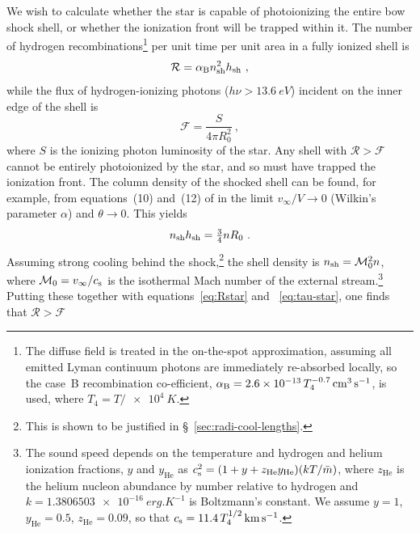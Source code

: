 We wish to calculate whether the star is capable of photoionizing the
entire bow shock shell, or whether the ionization front will be
trapped within it.  The number of hydrogen recombinations\footnote{%
  The diffuse field is treated in the on-the-spot approximation,
  assuming all emitted Lyman continuum photons are immediately
  re-absorbed locally, so the case~B recombination co-efficient,
  \(\alphaB = \num{2.6e-13}\, T_4^{-0.7}\, \si{cm^3.s^{-1}}\), is
  used, where \(T_4 = T/\SI{e4}{K}\).} %
per unit time per unit area in a fully ionized shell is
\begin{equation}
  \label{eq:shell-recombination-rate}
  \mathcal{R} = \alphaB n\shell^2 h\shell \ ,
\end{equation}
while the flux of hydrogen-ionizing photons
(\(h \nu > \SI{13.6}{eV}\)) incident on the inner edge of the shell is
\begin{equation}
  \label{eq:shell-ionizing-flux}
  \mathcal{F} = \frac{S} {4 \pi R_0^2} \ , 
\end{equation}
where \(S\) is the ionizing photon luminosity of the star.  Any shell
with \(\mathcal{R} > \mathcal{F}\) cannot be entirely photoionized by
the star, and so must have trapped the ionization front.  The column
density of the shocked shell can be found, for example, from
equations~(10) and~(12) of \citet{Wilkin:1996a} in the limit
\(v_\infty/V \to 0\) (Wilkin's parameter \(\alpha\)) and \(\theta \to 0\).  This yields
\begin{equation}
  \label{eq:shocked-shell-column}
  n\shell h\shell = \tfrac34 n R_0 \ .
\end{equation}
Assuming strong cooling behind the shock,\footnote{%
  This is shown to be justified in \S~\ref{sec:radi-cool-lengths}.
} %
the shell density is \(n\shell = \mathcal{M}_0^2 n\), where
\(\mathcal{M}_0 = v_\infty / \sound\) is the isothermal Mach number of the
external stream.\footnote{%
  \label{fn:temperature-dependence}
  The sound speed depends on the temperature and hydrogen and helium
  ionization fractions, \(y\) and \(y_{\text{He}}\) as
  \(\sound^2 = (1 + y + z_{\text{He}} y_{\text{He}}) (k T /
  \bar{m})\), where \(z_{\text{He}}\) is the helium nucleon abundance
  by number relative to hydrogen and
  \(k = \SI{1.3806503e-16}{erg.K^{-1}}\) is Boltzmann's constant.  We
  assume \(y = 1\), \(y_{\text{He}} = 0.5\), \(z_{\text{He}} = 0.09\),
  so that \(\sound = \num{11.4}\, T_4^{1/2}\, \si{km.s^{-1}}\). } %
Putting these together with equations~\eqref{eq:Rstar} and
~\eqref{eq:tau-star}, one finds that \(\mathcal{R} > \mathcal{F}\)
